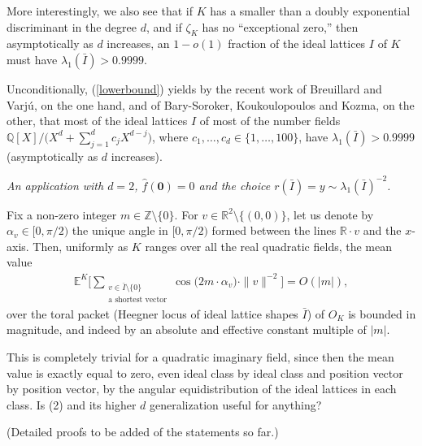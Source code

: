 \documentclass[12pt]{amsart}
\newcommand{\R}{\mathbb{R}}
\newcommand{\Z}{\mathbb{Z}}
\newcommand{\Q}{\mathbb{Q}}
\begin{document}
More interestingly, we also see that if $K$ has a smaller than a doubly exponential discriminant in the degree $d$,  and if $\zeta_K$ has no ``exceptional zero,'' then asymptotically as $d$ increases, an $1 - o(1)$ fraction of the ideal lattices $I$ of $K$ must have $\lambda_1(\bar{I}) > 0.9999$.

Unconditionally, (\ref{lowerbound}) yields by the recent work of Breuillard and Varj\'u, on the one hand, and of Bary-Soroker, Koukoulopoulos and Kozma, on the other, that most of the ideal lattices $I$ of most of the number fields $\Q[X] / \big( X^d + \sum_{j=1}^d c_jX^{d-j} \big)$, where $c_1, \ldots, c_d \in \{1, \ldots, 100\}$, have $\lambda_1(\bar{I}) > 0.9999$ (asymptotically as $d$ increases).



\newpage

{\it An application with $d = 2$, $\hat{f}(\mathbf{0}) = 0$ and the choice $r(\bar{I}) = y \sim \lambda_1(\bar{I})^{-2}$. }

\medskip

Fix a non-zero integer $m \in \Z \setminus \{0\}$. For $v \in \R^2 \setminus \{(0,0)\}$, let us denote by $\alpha_v \in [0, \pi/2)$ the unique angle in $[0,\pi/2)$ formed between the lines $\R \cdot v$ and the $x$-axis. Then, uniformly as $K$ ranges over all the real quadratic fields, the mean value
\begin{eqnarray} \label{newform}
\mathbb{E}^K \Big[ \sum_{\substack{ v \in \bar{I} \setminus \{0\} \\ \textrm{a shortest vector} }}  \cos\big(2 m \cdot \alpha_v \big) \cdot \|v\|^{-2} \Big] = O(|m|),
\end{eqnarray}
over the toral packet (Heegner locus of ideal lattice shapes $\bar{I}$) of $O_K$
is bounded in magnitude, and indeed by an absolute and effective constant multiple of $|m|$.

This is completely trivial for a quadratic imaginary field, since then the mean value is exactly equal to zero, even ideal class by ideal class and position vector by position vector, by the angular equidistribution of the ideal lattices in each class. Is (2) and its higher $d$ generalization useful for anything? 

\medskip

(Detailed proofs to be added of the statements so far.)
\end{document}
